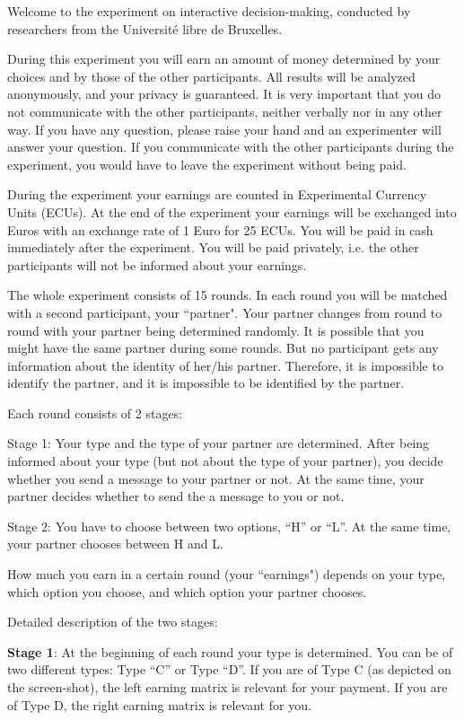 \documentclass[12pt]{article}
\theoremstyle{break}
\begin{document}
Welcome to the experiment on interactive decision-making, conducted by researchers from the Université libre de Bruxelles.

During this experiment you will earn an amount of money determined by your choices and by those of the other participants. All results will be analyzed anonymously, and your privacy is guaranteed. It is very important that you do not communicate with the other participants, neither verbally nor in any other way. If you have any question, please raise your hand and an experimenter will answer your question. If you communicate with the other participants during the experiment, you would have to leave the experiment without being paid. 

During the experiment your earnings are counted in Experimental Currency Units (ECUs). At the end of the experiment your earnings will be exchanged into Euros with an exchange rate of 1 Euro for 25 ECUs. You will be paid in cash immediately after the experiment. You will be paid privately, i.e. the other participants will not be informed about your earnings.

The whole experiment consists of 15 rounds. In each round you will be matched with a second participant, your ``partner". Your partner changes from round to round with your partner being determined randomly. It is possible that you might have the same partner during some rounds. But no participant gets any information about the identity of her/his partner. Therefore, it is impossible to identify the partner, and it is impossible to be identified by the partner.

Each round consists of 2 stages:

Stage 1: Your type and the type of your partner are determined. After being informed about your type (but not about the type of your partner), you decide whether you send a message to your partner or not. At the same time, your partner decides whether to send the a message to you or not.

Stage 2: You have to choose between two options, “H” or “L”. At the same time, your partner chooses between H and L. 

How much you earn in a certain round (your ``earnings") depends on your type, which option you choose, and which option your partner chooses. 

Detailed description of the two stages: 

\textbf{Stage 1}: At the beginning of each round your type is determined. You can be of two different types: Type “C” or Type “D”. If you are of Type C (as depicted on the screen-shot), the left earning matrix is relevant for your payment. If you are of Type D, the right earning matrix is relevant for you. 
\end{document}
